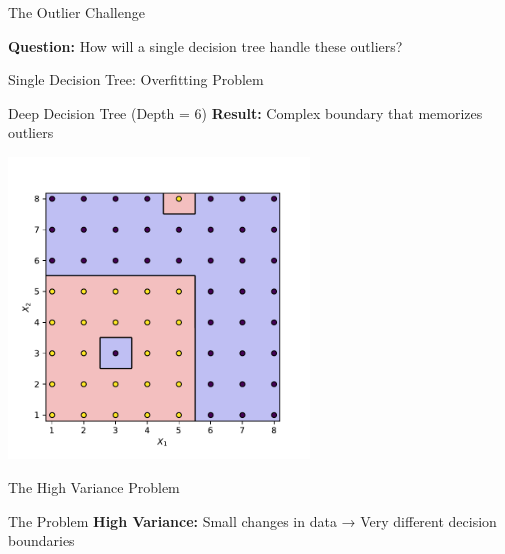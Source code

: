 \documentclass[9pt]{beamer}
\newcommand{\fitpic}[1]{\begin{adjustbox}{max width=\linewidth, max totalheight=0.78\textheight}#1\end{adjustbox}}
\begin{document}
\begin{frame}{The Outlier Challenge}
\begin{keypointsbox}
\textbf{Question:} How will a single decision tree handle these outliers?
\end{keypointsbox}
\end{frame}

\begin{frame}{Single Decision Tree: Overfitting Problem}
\begin{examplebox}{Deep Decision Tree (Depth = 6)}
\textbf{Result:} Complex boundary that memorizes outliers
\end{examplebox}

  \begin{center}
  \fitpic{\includegraphics[width = 0.6\textwidth]{../assets/ensemble/figures/strong-tree}}
  \end{center}
\end{frame}

\begin{frame}{The High Variance Problem}
\begin{alertbox}{The Problem}
\textbf{High Variance:} Small changes in data → Very different decision boundaries
\end{alertbox}
\end{frame}
\end{document}

